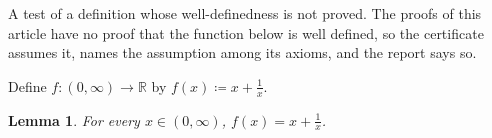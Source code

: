 \documentclass{article}
\newtheorem{lemma}{Lemma}
\begin{document}
A test of a definition whose well-definedness is not proved. The proofs of this article
have no proof that the function below is well defined, so the certificate assumes it,
names the assumption among its axioms, and the report says so.

Define $f:(0,\infty)\to\mathbb{R}$ by $f(x)\coloneqq x+\frac1x$.

\begin{lemma}\label{lem:value}
For every $x\in(0,\infty)$, $f(x)=x+\frac1x$.
\end{lemma}
\end{document}
